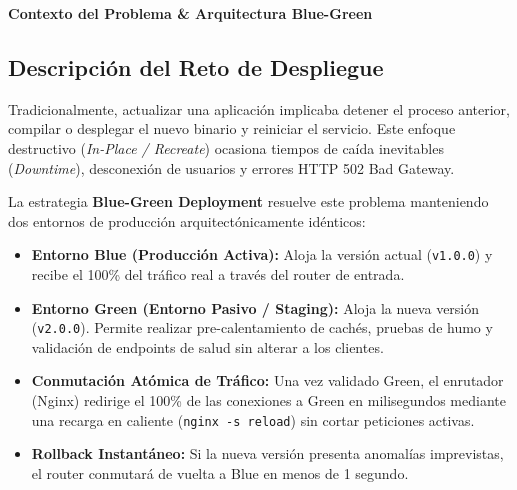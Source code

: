 \documentclass[10pt,letterpaper]{article}
\newcommand{\sectionBadge}[1]{%
  \refstepcounter{section}%
  \vspace{0.16cm}%
  \noindent%
  \colorbox{icesiBlue}{\color{white}\rule[-0.08cm]{0pt}{0.42cm}\hspace{0.16cm}\textbf{\normalsize \thesection}\hspace{0.16cm}}%
  \hspace{0.18cm}%
  {\fontsize{9.5}{12}\selectfont\textbf{\color{icesiDark}#1}}\\[-0.10cm]%
  \noindent{\color{icesiDark}\rule{\textwidth}{0.8pt}}\vspace{0.06cm}%
}
\begin{document}
\vspace{0.03cm}

\sectionBadge{Contexto del Problema \& Arquitectura Blue-Green}

\subsection{Descripción del Reto de Despliegue}
Tradicionalmente, actualizar una aplicación implicaba detener el proceso anterior, compilar o desplegar el nuevo binario y reiniciar el servicio. Este enfoque destructivo (\textit{In-Place / Recreate}) ocasiona tiempos de caída inevitables (\textit{Downtime}), desconexión de usuarios y errores HTTP 502 Bad Gateway.

La estrategia \textbf{Blue-Green Deployment} resuelve este problema manteniendo dos entornos de producción arquitectónicamente idénticos:
\begin{itemize}[itemsep=0.2pt,topsep=0.5pt]
  \item \textbf{Entorno Blue (Producción Activa):} Aloja la versión actual (\texttt{v1.0.0}) y recibe el 100\% del tráfico real a través del router de entrada.
  \item \textbf{Entorno Green (Entorno Pasivo / Staging):} Aloja la nueva versión (\texttt{v2.0.0}). Permite realizar pre-calentamiento de cachés, pruebas de humo y validación de endpoints de salud sin alterar a los clientes.
  \item \textbf{Conmutación Atómica de Tráfico:} Una vez validado Green, el enrutador (Nginx) redirige el 100\% de las conexiones a Green en milisegundos mediante una recarga en caliente (\texttt{nginx -s reload}) sin cortar peticiones activas.
  \item \textbf{Rollback Instantáneo:} Si la nueva versión presenta anomalías imprevistas, el router conmutará de vuelta a Blue en menos de 1 segundo.
\end{itemize}
\end{document}
